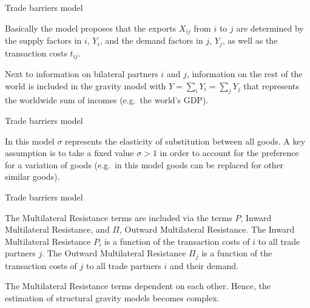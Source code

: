 \documentclass[ignorenonframetext,compress,aspectratio=169]{beamer}
\begin{document}
\begin{frame}{Trade barriers model}

Basically the model proposes that the exports \(X_{ij}\) from \(i\) to
\(j\) are determined by the supply factors in \(i\), \(Y_{i}\), and the
demand factors in \(j\), \(Y_{j}\), as well as the transaction costs
\(t_{ij}\).

Next to information on bilateral partners \(i\) and \(j\), information
on the rest of the world is included in the gravity model with
\(Y=\sum_{i} Y_{i}= \sum_{j} Y_{j}\) that represents the worldwide sum
of incomes (e.g.~the world's GDP).

\end{frame}

\begin{frame}{Trade barriers model}

In this model \(\sigma\) represents the elasticity of substitution
between all goods. A key assumption is to take a fixed value
\(\sigma > 1\) in order to account for the preference for a variation of
goods (e.g.~in this model goods can be replaced for other similar
goods).

\end{frame}

\begin{frame}{Trade barriers model}

The Multilateral Resistance terms are included via the terms \(P\),
Inward Multilateral Resistance, and \(\Pi\), Outward Multilateral
Resistance. The Inward Multilateral Resistance \(P_i\) is a function of
the transaction costs of \(i\) to all trade partners \(j\). The Outward
Multilateral Resistance \(\Pi_{j}\) is a function of the transaction
costs of \(j\) to all trade partners \(i\) and their demand.

The Multilateral Resistance terms dependent on each other. Hence, the
estimation of structural gravity models becomes complex.

\end{frame}
\end{document}
